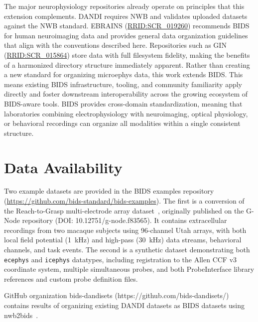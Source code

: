 \documentclass[fleqn,10pt]{article}
\newcommand{\rrid}[1]{\href{https://scicrunch.org/resolver/#1}{#1}}
\begin{document}
The major neurophysiology repositories already operate on principles that this extension complements.
DANDI requires NWB and validates uploaded datasets against the NWB standard.
EBRAINS (\rrid{RRID:SCR\_019260}) recommends BIDS for human neuroimaging data and provides general data organization guidelines that align with the conventions described here.
Repositories such as GIN (\rrid{RRID:SCR\_015864}) store data with full filesystem fidelity, making the benefits of a harmonized directory structure immediately apparent.
Rather than creating a new standard for organizing microephys data, this work extends BIDS.
This means existing BIDS infrastructure, tooling, and community familiarity apply directly and foster downstream interoperability across the growing ecosystem of BIDS-aware tools.
BIDS provides cross-domain standardization, meaning that laboratories combining electrophysiology with neuroimaging, optical physiology, or behavioral recordings can organize all modalities within a single consistent structure.



\section*{Data Availability}\label{sec:data-availability}

Two example datasets are provided in the BIDS examples repository (\url{https://github.com/bids-standard/bids-examples}).
The first is a conversion of the Reach-to-Grasp multi-electrode array dataset~\citep{brochier_massively_2018}, originally published on the G-Node repository (DOI: 10.12751/g-node.f83565).
It contains extracellular recordings from two macaque subjects using 96-channel Utah arrays, with both local field potential (1~kHz) and high-pass (30~kHz) data streams, behavioral channels, and task events.
The second is a synthetic dataset demonstrating both \texttt{ecephys} and \texttt{icephys} datatypes, including registration to the Allen CCF v3 coordinate system, multiple simultaneous probes, and both ProbeInterface library references and custom probe definition files.

GitHub organization bids-dandisets (https://github.com/bids-dandisets/) contains results of organizing existing DANDI datasets as BIDS datasets using nwb2bids~\citep{nwb2bids_zenodo}.
\end{document}
